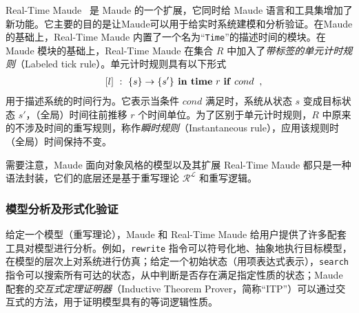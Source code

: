 Real-Time Maude~\cite{DBLP:journals/lisp/OlveczkyM07} 是 Maude 的一个扩展，它同时给 Maude 语言和工具集增加了新功能。它主要的目的是让Maude可以用于给实时系统建模和分析验证。在Maude的基础上，Real-Time Maude 内置了一个名为“\verb|Time|”的描述时间的模块。在 Maude 模块的基础上，Real-Time Maude 在集合 $\mathit{R}$ 中加入了\emph{带标签的单元计时规则}（Labeled tick rule）。单元计时规则具有以下形式
\begin{eqnarray}
& & [l]~:~\{s\}\rightarrow\{s'\} \mbox{\textbf{ in time}
  }r\mbox{ \textbf{if} }cond \;\; , \nonumber
\end{eqnarray} 
用于描述系统的时间行为。它表示当条件 $cond$ 满足时，系统从状态 $s$ 变成目标状态 $s'$，（全局）时间往前推移 $r$ 个时间单位。为了区别于单元计时规则，$\mathit{R}$ 中原来的不涉及时间的重写规则，称作\emph{瞬时规则}（Instantaneous rule），应用该规则时（全局）时间保持不变。

需要注意，Maude 面向对象风格的模型以及其扩展 Real-Time Maude 都只是一种语法封装，它们的底层还是基于重写理论 $\mathcal{R^L}$ 和重写逻辑。 

\subsubsection{模型分析及形式化验证}
给定一个模型（重写理论），Maude 和 Real-Time Maude 给用户提供了许多配套工具对模型进行分析。例如，\verb|rewrite| 指令可以符号化地、抽象地执行目标模型，在模型的层次上对系统进行仿真；给定一个初始状态（用项表达式表示），\verb|search| 指令可以搜索所有可达的状态，从中判断是否存在满足指定性质的状态；Maude 配套的\emph{交互式定理证明器}（Inductive Theorem Prover，简称“ITP”）可以通过交互式的方法，用于证明模型具有的等词逻辑性质。

